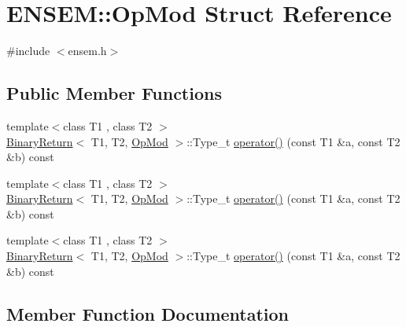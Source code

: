 \hypertarget{structENSEM_1_1OpMod}{}\section{E\+N\+S\+EM\+:\+:Op\+Mod Struct Reference}
\label{structENSEM_1_1OpMod}


{\ttfamily \#include $<$ensem.\+h$>$}

\subsection*{Public Member Functions}
\begin{DoxyCompactItemize}
\item 
{\footnotesize template$<$class T1 , class T2 $>$ }\\\mbox{\hyperlink{structENSEM_1_1BinaryReturn}{Binary\+Return}}$<$ T1, T2, \mbox{\hyperlink{structENSEM_1_1OpMod}{Op\+Mod}} $>$\+::Type\+\_\+t \mbox{\hyperlink{structENSEM_1_1OpMod_ab377d613c8fa223caa60de3292a55685}{operator()}} (const T1 \&a, const T2 \&b) const
\item 
{\footnotesize template$<$class T1 , class T2 $>$ }\\\mbox{\hyperlink{structENSEM_1_1BinaryReturn}{Binary\+Return}}$<$ T1, T2, \mbox{\hyperlink{structENSEM_1_1OpMod}{Op\+Mod}} $>$\+::Type\+\_\+t \mbox{\hyperlink{structENSEM_1_1OpMod_ab377d613c8fa223caa60de3292a55685}{operator()}} (const T1 \&a, const T2 \&b) const
\item 
{\footnotesize template$<$class T1 , class T2 $>$ }\\\mbox{\hyperlink{structENSEM_1_1BinaryReturn}{Binary\+Return}}$<$ T1, T2, \mbox{\hyperlink{structENSEM_1_1OpMod}{Op\+Mod}} $>$\+::Type\+\_\+t \mbox{\hyperlink{structENSEM_1_1OpMod_ab377d613c8fa223caa60de3292a55685}{operator()}} (const T1 \&a, const T2 \&b) const
\end{DoxyCompactItemize}


\subsection{Member Function Documentation}
\mbox{\label{structENSEM_1_1OpMod_ab377d613c8fa223caa60de3292a55685}} 
